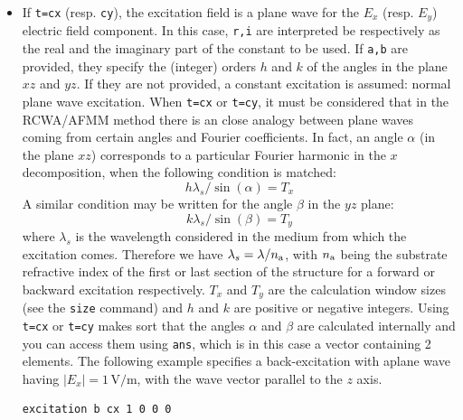 \begin{itemize}
            
\item[--] If \lstinline!t=cx! (resp. \lstinline!cy!), the excitation field is a plane wave for the
            $E_x$ (resp. $E_y$) electric field component. In this case, \lstinline!r,i! are interpreted be respectively as the real and the imaginary part of the constant to be used. If \lstinline!a,b! are provided, they specify the (integer) orders $h$ and $k$ of the angles in the plane $xz$ and $yz$. If they are not provided, a constant excitation is assumed: normal plane wave excitation.
When \lstinline!t=cx! or \lstinline!t=cy!, it must be considered that in the RCWA/AFMM method there is an close analogy between plane waves coming from certain angles and Fourier coefficients. In fact, an angle $\alpha$ (in the plane $xz$) corresponds to a particular Fourier harmonic in the $x$ decomposition, when the following condition is matched:
\begin{equation}
h\lambda_s/\sin(\alpha)= T_x
\end{equation}
A similar condition may be written for the angle $\beta$ in the  $yz$ plane:
\begin{equation}
k\lambda_s/\sin(\beta)= T_y
\end{equation}
where $\lambda_s$ is the wavelength considered in the medium from which the excitation comes. Therefore we have $\lambda_s=\lambda/n_\mathrm{a}$, with $n_\mathrm{a}$ being the substrate refractive index of the first or last section of the structure for a forward or backward excitation respectively. $T_x$ and $T_y$ are the calculation window sizes (see the \lstinline!size! command) and $h$ and $k$ are positive or negative integers.
Using \lstinline!t=cx! or \lstinline!t=cy! makes sort that the angles $\alpha$ and $\beta$ are calculated internally and you can access them using \lstinline!ans!, which is in this case a vector containing 2 elements.
The following example specifies a back-excitation with aplane wave having $|E_x|=1\,\mathrm{V/m}$, with the wave vector parallel to the $z$ axis.
\begin{lstlisting}
excitation b cx 1 0 0 0
\end{lstlisting}



\end{itemize}

